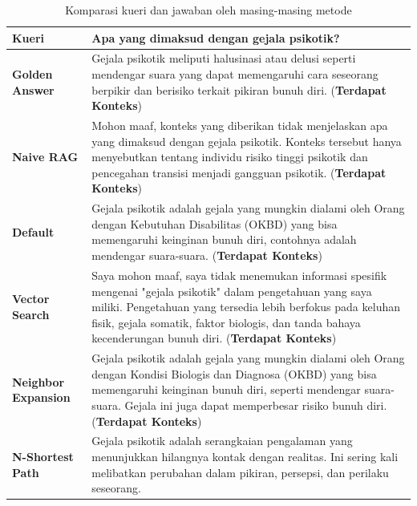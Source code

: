 \begin{longtable}{|p{2cm}|p{11cm}|}
	\caption{Komparasi kueri dan jawaban oleh masing-masing metode} \label{tab:final-answer-case-1}                                                                                                                                                                                                                                \\
	\hline
	\textbf{Kueri}                  & Apa yang dimaksud dengan gejala psikotik?                                                                                                                                                                                                                                                    \\
	\hline \hline

	\textbf{Golden Answer}          & Gejala psikotik meliputi halusinasi atau delusi seperti mendengar suara yang dapat memengaruhi cara seseorang berpikir dan berisiko terkait pikiran bunuh diri. (\textbf{Terdapat Konteks})                                                                                                  \\
	\hline
	\textbf{Naive RAG}              & Mohon maaf, konteks yang diberikan tidak menjelaskan apa yang dimaksud dengan gejala psikotik. Konteks tersebut hanya menyebutkan tentang individu risiko tinggi psikotik dan pencegahan transisi menjadi gangguan psikotik. (\textbf{Terdapat Konteks})                                     \\
	\hline
	\textbf{Default}                & Gejala psikotik adalah gejala yang mungkin dialami oleh Orang dengan Kebutuhan Disabilitas (OKBD) yang bisa memengaruhi keinginan bunuh diri, contohnya adalah mendengar suara-suara. (\textbf{Terdapat Konteks})                                                                            \\
	\hline
	\textbf{Vector \newline Search} & Saya mohon maaf, saya tidak menemukan informasi spesifik mengenai "gejala psikotik" dalam pengetahuan yang saya miliki. Pengetahuan yang tersedia lebih berfokus pada keluhan fisik, gejala somatik, faktor biologis, dan tanda bahaya kecenderungan bunuh diri. (\textbf{Terdapat Konteks}) \\
	\hline
	\textbf{Neighbor Expansion}     & Gejala psikotik adalah gejala yang mungkin dialami oleh Orang dengan Kondisi Biologis dan Diagnosa (OKBD) yang bisa memengaruhi keinginan bunuh diri, seperti mendengar suara-suara. Gejala ini juga dapat memperbesar risiko bunuh diri. (\textbf{Terdapat Konteks})                        \\
	\hline
	\textbf{N-Shortest Path}        &
	\begin{minipage}[t]{10cm}
		Gejala psikotik adalah serangkaian pengalaman yang menunjukkan hilangnya kontak dengan realitas. Ini sering kali melibatkan perubahan dalam pikiran, persepsi, dan perilaku seseorang.


\end{minipage}
\end{longtable}
